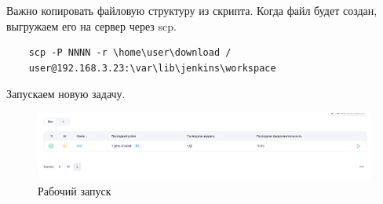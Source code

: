 Важно копировать файловую структуру из скрипта. Когда файл будет создан, выгружаем его на сервер через scp.
\begin{verbatim}
    scp -P NNNN -r \home\user\download / 
    user@192.168.3.23:\var\lib\jenkins\workspace 
\end{verbatim}
Запускаем новую задачу. 
\begin{figure}
    \centering
    \includegraphics[width=0.5\linewidth]{pic/10.png}
    \caption{Рабочий запуск}
    \label{fig:enter-label}
\end{figure}

